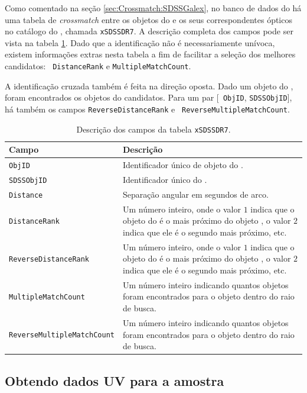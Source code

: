 Como comentado na seção \ref{sec:Crossmatch:SDSSGalex}, no banco de dados do
\galex há uma tabela de {\em crossmatch} entre os objetos do \galex e os seus
correspondentes ópticos no catálogo do \SDSS, chamada {\tt xSDSSDR7}. A
descrição completa dos campos pode ser vista na tabela \ref{tab:CamposXSDSSDR7}.
Dado que a identificação não é necessariamente unívoca, existem informações
extras nesta tabela a fim de facilitar a seleção dos melhores candidatos: {\tt
DistanceRank} e {\tt MultipleMatchCount}.

A identificação cruzada também é feita na direção oposta. Dado um objeto do
\SDSS, foram encontrados os objetos do \galex candidatos. Para um par [{\tt
ObjID}, {\tt SDSSObjID}], há também os campos {\tt ReverseDistanceRank} e {\tt
ReverseMultipleMatchCount}.

\begin{table}
	\caption[Descrição dos campos da tabela {\tt xSDSSDR7}.]
	{Descrição dos campos da tabela {\tt xSDSSDR7}.}
	\begin{tabular}{l p{8cm}}
		Campo & Descrição\\
		\midrule
		{\tt ObjID} &
		Identificador único de objeto do \galex.
		\\
		{\tt SDSSObjID} &
		Identificador único do \SDSS.
		\\
		{\tt Distance} &
		Separação angular em segundos de arco.
		\\
		{\tt DistanceRank} &
		Um número inteiro, onde o valor $1$ indica que o objeto do \galex é o
		mais próximo do objeto \SDSS, o valor $2$ indica que ele é o segundo mais
		próximo, etc.
		\\
		{\tt ReverseDistanceRank} &
		Um número inteiro, onde o valor $1$ indica que o objeto do \SDSS é o mais
		próximo do objeto \galex, o valor $2$ indica que ele é o segundo mais
		próximo, etc.
		\\
		{\tt MultipleMatchCount} &
		Um número inteiro indicando quantos objetos \SDSS foram encontrados para o
		objeto \galex dentro do raio de busca.
		\\
		{\tt ReverseMultipleMatchCount} &
		Um número inteiro indicando quantos objetos \galex foram encontrados para o
		objeto \SDSS dentro do raio de busca.
		\\
	\end{tabular}
	\label{tab:CamposXSDSSDR7}
\end{table}

\subsection{Obtendo dados UV para a amostra \STARLIGHT}


